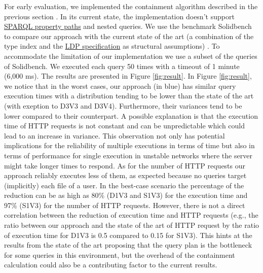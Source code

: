 For early evaluation, we implemented the containment algorithm described in the previous section .
In its current state, the implementation doesn't support 
\href{https://www.w3.org/TR/sparql11-query/#propertypaths}{SPARQL property paths} and nested queries.
We use the benchmark Solidbench \cite{Taelman2023} to compare our approach with the current state of the art 
(a combination of the type index and the \href{https://www.w3.org/TR/ldp/}{LDP specification} as structural assumptions) \cite{Taelman2023}.
To accommodate the limitation of our implementation we use a subset of the queries of Solidbench.
We executed each query 50 times with a timeout of 1 minute (6,000 ms).
The results are presented in Figure \ref{fig:result}.
In Figure \ref{fig:result}, we notice that in the worst cases, our approach (in blue) has similar query execution times with a 
distribution tending to be lower than the state of the art (with exeption to D3V3 and D3V4).
Furthermore, their variances tend to be lower compared to their counterpart. 
A possible explanation is that the execution time of HTTP requests is not constant and can be unpredictable \cite{hartig2016walking}
which could lead to an increase in variance.
This observation not only has potential implications for the reliability of multiple executions in terms of time
but also in terms of performance for single execution in unstable networks where the server might take longer times to respond. 
As for the number of HTTP requests our approach reliably executes less of them, as expected because no
queries target (implicitly) each file of a user.
In the best-case scenario the percentage of the reduction can be as high as 80\% (D1V3 and S1V3) for the execution time 
and 97\% (S1V3) for the number of HTTP requests.
However, there is not a direct correlation between the reduction of execution time and HTTP requests (e.g., the ratio 
between our approach and the state of the art of HTTP request by the ratio of execution time for D1V3 is 0.5 compared to 0.15 for S1V3).
This hints at the results from the state of the art \cite{Taelman2023} proposing that the query plan is the bottleneck for some queries in this environment,
but the overhead of the containment calculation could also be a contributing factor to the current results.

  